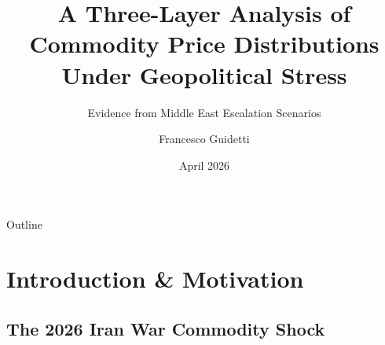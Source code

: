 ﻿\documentclass[aspectratio=1610]{beamer}
\title[Three-Layer Commodity Price Analysis]{A Three-Layer Analysis of Commodity Price Distributions\\Under Geopolitical Stress}
\subtitle{Evidence from Middle East Escalation Scenarios}
\author[F.~Guidetti]{Francesco Guidetti}
\date{April 2026}
\begin{document}
\begin{frame}[plain]
  \titlepage
\end{frame}

\begin{frame}[shrink=20]{Outline}
  \tableofcontents[hideallsubsections]
\end{frame}

\section{Introduction \& Motivation}

\subsection{The 2026 Iran War Commodity Shock}
\end{document}
